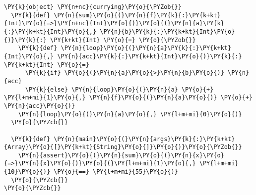 \begin{Verbatim}[commandchars=\\\{\}]
\PY{k}{object} \PY{n+nc}{currying}\PY{o}{\PYZob{}}
  \PY{k}{def} \PY{n}{sum}\PY{o}{(}\PY{n}{f}\PY{k}{:}\PY{k+kt}{Int}\PY{o}{=>}\PY{n+nc}{Int}\PY{o}{)}\PY{o}{(}\PY{n}{a}\PY{k}{:}\PY{k+kt}{Int}\PY{o}{,} \PY{n}{b}\PY{k}{:}\PY{k+kt}{Int}\PY{o}{)}\PY{k}{:} \PY{k+kt}{Int} \PY{o}{=} \PY{o}{\PYZob{}}
    \PY{k}{def} \PY{n}{loop}\PY{o}{(}\PY{n}{a}\PY{k}{:}\PY{k+kt}{Int}\PY{o}{,} \PY{n}{acc}\PY{k}{:}\PY{k+kt}{Int}\PY{o}{)}\PY{k}{:} \PY{k+kt}{Int} \PY{o}{=}
      \PY{k}{if} \PY{o}{(}\PY{n}{a}\PY{o}{>}\PY{n}{b}\PY{o}{)} \PY{n}{acc}
      \PY{k}{else} \PY{n}{loop}\PY{o}{(}\PY{n}{a} \PY{o}{+} \PY{l+m+mi}{1}\PY{o}{,} \PY{n}{f}\PY{o}{(}\PY{n}{a}\PY{o}{)} \PY{o}{+} \PY{n}{acc}\PY{o}{)}
    \PY{n}{loop}\PY{o}{(}\PY{n}{a}\PY{o}{,} \PY{l+m+mi}{0}\PY{o}{)}
  \PY{o}{\PYZcb{}}
  
  \PY{k}{def} \PY{n}{main}\PY{o}{(}\PY{n}{args}\PY{k}{:}\PY{k+kt}{Array}\PY{o}{[}\PY{k+kt}{String}\PY{o}{]}\PY{o}{)}\PY{o}{\PYZob{}}
    \PY{n}{assert}\PY{o}{(}\PY{n}{sum}\PY{o}{(}\PY{n}{x}\PY{o}{=>}\PY{n}{x}\PY{o}{)}\PY{o}{(}\PY{l+m+mi}{1}\PY{o}{,} \PY{l+m+mi}{10}\PY{o}{)} \PY{o}{==} \PY{l+m+mi}{55}\PY{o}{)}
  \PY{o}{\PYZcb{}}
\PY{o}{\PYZcb{}}
\end{Verbatim}
